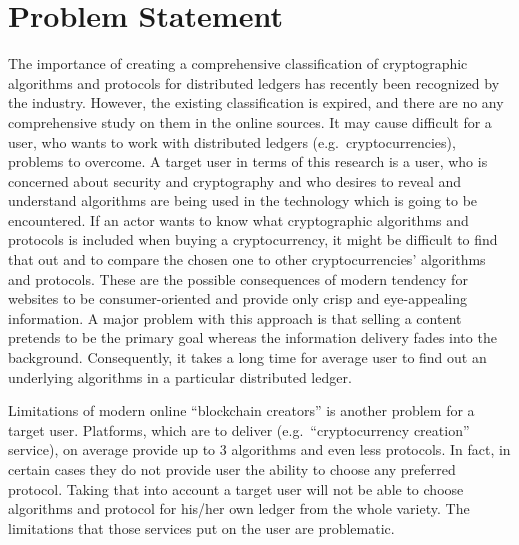 \documentclass[12pt]{article}
\begin{document}
\section{Problem Statement}
The importance of creating a comprehensive classification of cryptographic
algorithms and protocols for distributed ledgers has recently been recognized
by the industry. However, the existing classification is expired, and there are
no any comprehensive study on them in the online sources. It may cause
difficult for a user, who wants to work with distributed ledgers (e.g.\
cryptocurrencies), problems to overcome. A {target user}\label{user} in terms
of this research is a user, who is concerned about security and cryptography
and who desires to reveal and understand algorithms are being used in the
technology which is going to be encountered. If an actor wants to know what
cryptographic algorithms and protocols is included when buying a
cryptocurrency, it might be difficult to find that out and to compare the
chosen one to other cryptocurrencies' algorithms and protocols. These are the
possible consequences of modern tendency for websites to be consumer-oriented
and provide only crisp and eye-appealing information. A major problem with this
approach is that selling a content pretends to be the primary goal whereas the
information delivery fades into the background. Consequently, it takes a long
time for average user to find out an underlying algorithms in a particular
distributed ledger.

Limitations of modern online ``blockchain creators'' is another problem for a
target user. Platforms, which are to deliver (e.g.\ ``cryptocurrency creation''
service), on average provide up to 3 algorithms and even less protocols. In
fact, in certain cases they do not provide user the ability to choose any
preferred protocol. Taking that into account a target user will not be able to
choose algorithms and protocol for his/her own ledger from the whole variety.
The limitations that those services put on the user are problematic.
\end{document}
